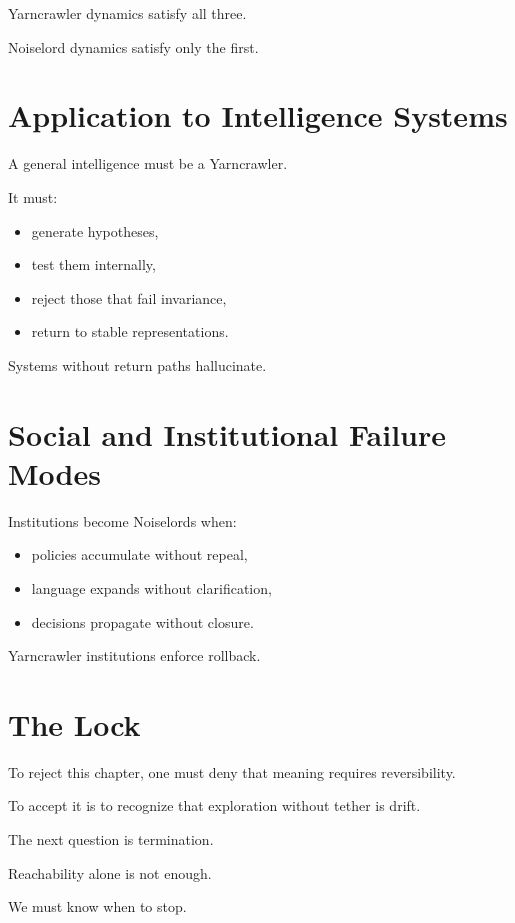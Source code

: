 \documentclass[11pt]{book}
\begin{document}
Yarncrawler dynamics satisfy all three.

Noiselord dynamics satisfy only the first.

\section{Application to Intelligence Systems}

A general intelligence must be a Yarncrawler.

It must:

\begin{itemize}
\item generate hypotheses,
\item test them internally,
\item reject those that fail invariance,
\item return to stable representations.
\end{itemize}

Systems without return paths hallucinate.

\section{Social and Institutional Failure Modes}

Institutions become Noiselords when:

\begin{itemize}
\item policies accumulate without repeal,
\item language expands without clarification,
\item decisions propagate without closure.
\end{itemize}

Yarncrawler institutions enforce rollback.

\section{The Lock}

To reject this chapter, one must deny that meaning requires reversibility.

To accept it is to recognize that exploration without tether is drift.

The next question is termination.

Reachability alone is not enough.

We must know when to stop.

\end{document}
